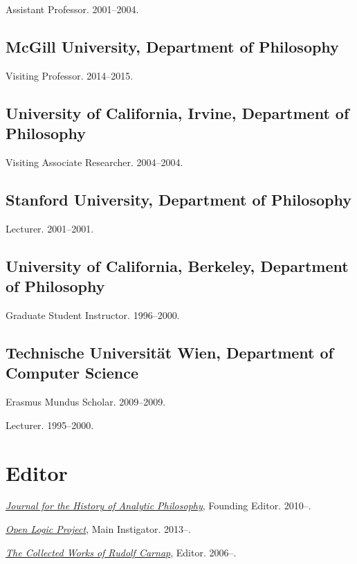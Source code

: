 \documentclass[11pt]{article}
\def\printdate#1{\xprintdate#1-}
\def\xprintdate#1-#2-#3-{#1}
\def\daterange#1#2{\xprintdate#1---\xprintdate#2-}
\begin{document}
\ind Assistant Professor. \daterange{2001-07-01}{2004-06-30}.

\subsection{McGill University, Department of Philosophy}
\ind Visiting Professor. \daterange{2014-10-01}{2015-06-30}.

\subsection{University of California, Irvine, Department of Philosophy}
\ind Visiting Associate Researcher. \daterange{2004-10-01}{2004-12-31}.

\subsection{Stanford University, Department of Philosophy}
\ind Lecturer. \daterange{2001-01-01}{2001-06-30}.

\subsection{University of California, Berkeley, Department of Philosophy}
\ind Graduate Student Instructor. \daterange{1996-09-01}{2000-12-31}.

\subsection{Technische Universität Wien, Department of Computer Science}
\ind Erasmus Mundus Scholar. \daterange{2009-00-00}{2009-00-00}.

\ind Lecturer. \daterange{1995-03-01}{2000-06-30}.



\section{Editor}

\ind \textit{\href{https://jhaponline.org/}{Journal for the History of Analytic Philosophy}}, Founding Editor. \printdate{2010-00-00}--.

\ind \textit{\href{http://openlogicproject.org/}{Open Logic Project}}, Main Instigator. \printdate{2013-00-00}--.

\ind \textit{\href{http://rudolfcarnap.org/}{The Collected Works of Rudolf Carnap}}, Editor. \printdate{2006-00-00}--.
\end{document}
